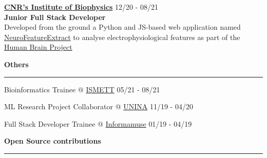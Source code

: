 \documentclass[10pt,letterpaper]{article}
\begin{document}
\begin{justify}
\begin{itemize}[label={}, leftmargin=0pt]
\begin{item}
                  \textbf{\href{https://www.ibf.cnr.it}{CNR's Institute of Biophysics}}
                  \hfill
                  \small{12/20 - 08/21}
                  \\
                  \small{\textbf{Junior Full Stack Developer}}
                  \\
                  Developed from the ground a Python and JS-based web application named
                  \href{https://hhnb.ebrains-italy.eu/efelg/}{NeuroFeatureExtract}
                  to analyse electrophysiological features as part of the
                  \href{https://www.humanbrainproject.eu/en/}{Human Brain Project}
            \end{item}
      \end{itemize}
      \vspace{0.05cm}
      \begin{minipage}[t]{10.25cm}
            \textbf{Others}\strut
            \hrule
            \vspace{0.2cm}
            \begin{itemize}[label={}, leftmargin=0pt]
                  \begin{item}
                        Bioinformatics Trainee @ \href{https://www.ismett.edu/en/}{ISMETT}
                        \hfill
                        \small{05/21 - 08/21}
                  \end{item}
                  \begin{item}
                        ML Research Project Collaborator @ \href{https://www.unina.it/en_GB}{UNINA}
                        \hfill
                        \small{11/19 - 04/20}
                  \end{item}
                  \begin{item}
                        Full Stack Developer Trainee @ \href{https://www.informamuse.com/en/home/}{Informamuse}
                        \hfill
                        \small{01/19 - 04/19}
                  \end{item}
            \end{itemize}
      \end{minipage}
      \hfill
      \begin{minipage}[t]{8.05cm}
            \textbf{Open Source contributions}\strut
            \hrule
            \vspace{0.2cm}
            \makeatletter
            \let\oldHy@colorlink\Hy@colorlink
            \def\Hy@colorlink#1{\begingroup\normalfont\ttfamily}%
            \makeatother

\end{minipage}
\end{justify}
\end{document}
